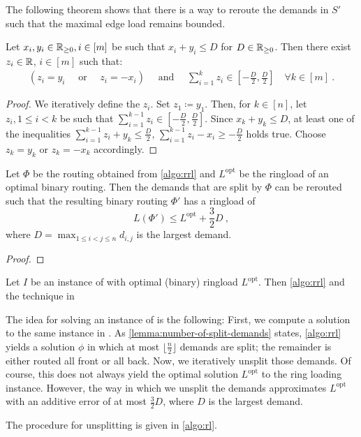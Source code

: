 The following theorem shows that there is a way to reroute the demands in $S'$ such that the maximal edge load remains bounded.
\begin{lemma}
	Let $x_i, y_i \in \mathbb{R}_{\geq 0}, i \in [m]$ be such that $x_i + y_i \leq D$ for $D \in \mathbb{R}_{\geq 0}$.
	Then there exist $z_i \in \mathbb{R}$, $i \in [m]$ such that:
	\begin{align}
		(z_i = y_i \quad \text{ or } \quad z_i = -x_i) 
		\quad \text{ and } \quad \sum_{i=1}^k z_i \in \left[-\frac{D}{2}, \frac{D}{2}\right] \quad \forall k \in [m] \ .
	\end{align}
\end{lemma}
\begin{proof}
	We iteratively define the $z_i$.
	Set $z_1 \coloneqq y_1$.
	Then, for $k \in [n]$, let $z_i, 1 \leq i < k$ be such that $\sum_{i=1}^{k-1} z_i \in \left[-\frac{D}{2}, \frac{D}{2}\right]$.
	Since $x_k + y_k \leq D$, at least one of the inequalities $\sum_{i=1}^{k-1} z_i + y_k \leq \frac{D}{2}$, $\sum_{i=1}^{k-1} z_i - x_i \geq -\frac{D}{2}$ holds true.
	Choose $z_k = y_k$ or $z_k = -x_k$ accordingly.	
\end{proof}
\begin{theorem}
	\label{theo:ring-loading-algorithm}
	Let $\Phi$ be the routing obtained from \cref{algo:rrl} and $L^\mathrm{opt}$ be the ringload of an optimal binary routing.
	Then the demands that are split by $\Phi$ can be rerouted such that the resulting binary routing $\Phi'$ has a ringload of
	\begin{equation}
		L(\Phi') \leq L^\mathrm{opt} + \frac{3}{2}D \ ,
	\end{equation}
	where $D = \max_{1 \leq i < j \leq n} d_{i, j}$ is the largest demand.
\end{theorem}
\begin{proof}
	
\end{proof}

\begin{corollary}
	Let $I$ be an instance of \RL with optimal (binary) ringload $L^\mathrm{opt}$.
	Then \cref{algo:rrl} and the technique in 
\end{corollary}


The idea for solving an instance of \RL is the following:
First, we compute a solution to the same instance in \RRL.
As \cref{lemma:number-of-split-demands} states, \cref{algo:rrl} yields a solution $\phi$ in which at most $\lfloor\frac{n}{2}\rfloor$ demands are split; the remainder is either routed all front or all back.
Now, we iteratively unsplit those demands.
Of course, this does not always yield the optimal solution $L^\mathrm{opt}$ to the ring loading instance.
However, the way in which we unsplit the demands approximates $L^\mathrm{opt}$ with an additive error of at most $\frac{3}{2}D$, where $D$ is the largest demand.

The procedure for unsplitting is given in \cref{algo:rl}.



